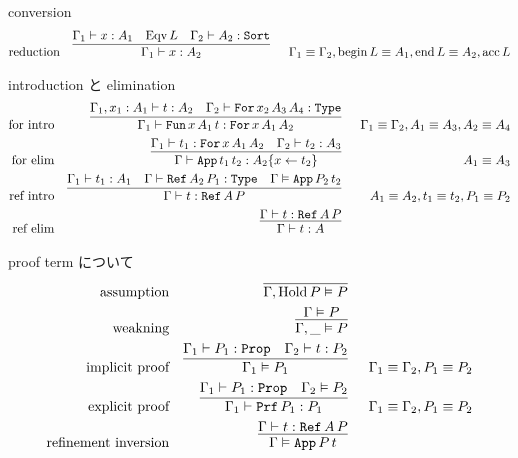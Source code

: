 \begin{itembox}[l]{conversion}
\begin{align*}
  \text{reduction} &&
  \infer[]{
    \Gamma_1 \vdash x : A_2}{\Gamma_1 \vdash x : A_1 & \text{Eqv} \, L & \Gamma_2 \vdash A_2 : \texttt{Sort}
  } && \Gamma_1 \equiv \Gamma_2 , \text{begin} \, L \equiv A_1 , \text{end} \, L \equiv A_2 , \text{acc} \, L
\end{align*}
\end{itembox}

\begin{itembox}[l]{introduction と elimination}
\begin{align*}
  \text{for intro} &&
  \infer[]{
    \Gamma_1 \vdash \texttt{Fun} \, x \, A_1 \, t : \texttt{For} \, x \, A_1 \, A_2}{\Gamma_1 , x_1 : A_1 \vdash t : A_2 & \Gamma_2 \vdash \texttt{For} \, x_2 \, A_3 \, A_4 : \texttt{Type}} && \Gamma_1 \equiv \Gamma_2 , A_1 \equiv A_3 , A_2 \equiv A_4 \\
  \text{for elim} &&
  \infer[]{
    \Gamma \vdash \texttt{App} \, t_1 \, t_2 : A_2\{x \leftarrow t_2\}}{\Gamma_1 \vdash t_1 : \texttt{For} \, x \, A_1 \, A_2 & \Gamma_2 \vdash t_2 : A_3} && A_1 \equiv A_3 \\
  \text{ref intro} &&
  \infer[]{
    \Gamma \vdash t : \texttt{Ref} \, A \, P}{\Gamma_1 \vdash t_1 : A_1 & \Gamma \vdash \texttt{Ref} \, A_2 \, P_1 : \texttt{Type} & \Gamma \vDash \texttt{App} \, P_2 \, t_2} && A_1 \equiv A_2 , t_1 \equiv t_2 , P_1 \equiv P_2 \\
  \text{ref elim} &&
  \infer[]{
    \Gamma \vdash t : A}{\Gamma \vdash t : \texttt{Ref} \, A \, P}
\end{align*}
\end{itembox}

\begin{itembox}[l]{proof term について}
\begin{align*}
  \text{assumption} &&
  \infer[]{\Gamma , \text{Hold} \, P \vDash P}{} \\
  \text{weakning} &&
  \infer[]{\Gamma , \_ \vDash P}{\Gamma \vDash P} \\
  \text{implicit proof} &&
  \infer[]{\Gamma_1 \vDash P_1}{\Gamma_1 \vdash P_1 : \texttt{Prop} & \Gamma _2 \vdash t : P_2} && \Gamma_1 \equiv \Gamma_2 , P_1 \equiv P_2 \\
  \text{explicit proof} &&
  \infer[]{\Gamma_1 \vdash \texttt{Prf} \, P_1 : P_1}{\Gamma_1 \vdash P_1 : \texttt{Prop} &\Gamma_2 \vDash P_2} && \Gamma_1 \equiv \Gamma_2 , P_1 \equiv P_2 \\
  \text{refinement inversion} && 
  \infer[]{\Gamma \vDash \texttt{App} \, P \, t}{\Gamma \vdash t : \texttt{Ref} \, A \, P}
\end{align*}
\end{itembox}